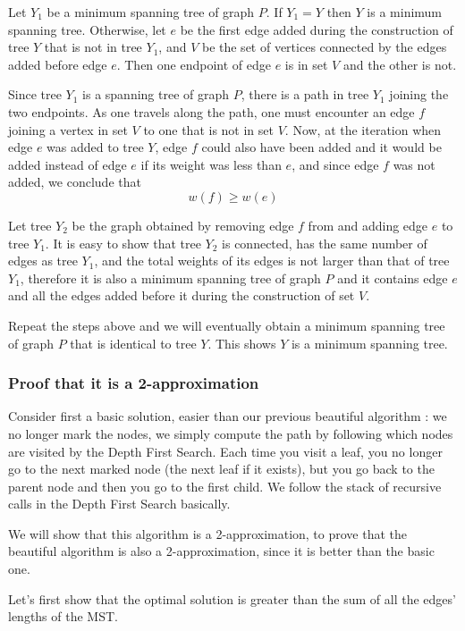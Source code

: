\documentclass[11pt]{article}
\begin{document}
Let $Y_1$ be a minimum spanning tree of graph $P$. If $Y_1=Y$ then $Y$
is a minimum spanning tree. Otherwise, let $e$ be the first edge added during the construction of tree $Y$ that is not in tree $Y_1$, 
and $V$ be the set of vertices connected by the edges added before edge $e$. Then one endpoint of edge $e$ is in set $V$ and the other is not. 

Since tree $Y_1$ is a spanning tree of graph $P$, there is a path in tree $Y_1$ joining the two endpoints. As one travels along the path, 
one must encounter an edge $f$ joining a vertex in set $V$ to one that is not in set $V$. Now, at the iteration when edge $e$ was added to tree $Y$, 
edge $f$ could also have been added and it would be added instead of edge $e$ if its weight was less than $e$, and since edge $f$ was 
not added, we conclude that
\[
	w(f) \ge w(e)
\]

Let tree $Y_2$ be the graph obtained by removing edge $f$ from and adding edge $e$ to tree $Y_1$. It is easy to show that tree $Y_2$ 
is connected, has the same number of edges as tree $Y_1$, and the total weights of its edges is not larger than that of tree $Y_1$, 
therefore it is also a minimum spanning tree of graph $P$ and it contains edge $e$ and all the edges added before it during the 
construction of set $V$. 

Repeat the steps above and we will eventually obtain a minimum spanning tree of graph $P$ that is identical to tree $Y$. 
This shows $Y$ is a minimum spanning tree.

\subsubsection{Proof that it is a 2-approximation}

Consider first a basic solution, easier than our previous beautiful algorithm : we no longer mark the nodes, 
we simply compute the path by following which nodes are visited by the Depth First Search. Each time you visit a leaf, 
you no longer go to the next marked node (the next leaf if it exists), but you go back to the parent node and then you 
go to the first child. We follow the stack of recursive calls in the Depth First Search basically.

We will show that this algorithm is a 2-approximation, to prove that the beautiful algorithm 
is also a 2-approximation, since it is better than the basic one.

Let's first show that the optimal solution is greater than the sum of all the edges' lengths of the MST.
\end{document}
